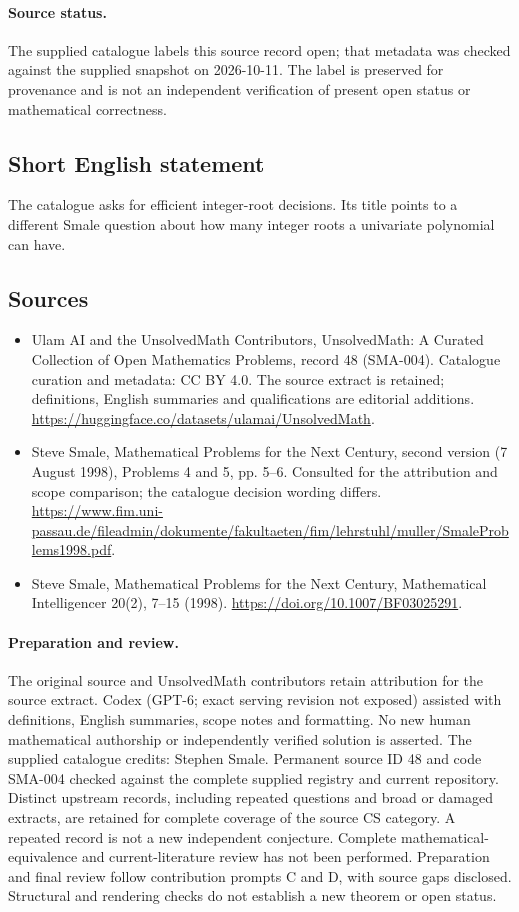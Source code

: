 \documentclass[11pt]{article}
\begin{document}
\paragraph{Source status.}
The supplied catalogue labels this source record open; that metadata was checked against the supplied snapshot on 2026-10-11. The label is preserved for provenance and is not an independent verification of present open status or mathematical correctness.
\subsection{Short English statement}
The catalogue asks for efficient integer-root decisions. Its title points to a different Smale question about how many integer roots a univariate polynomial can have.
\subsection{Sources}
\begin{itemize}
\item[\hypertarget{source:48:1}{S1}] Ulam AI and the UnsolvedMath Contributors, UnsolvedMath: A Curated Collection of Open Mathematics Problems, record 48 (SMA-004). Catalogue curation and metadata: CC BY 4.0. The source extract is retained; definitions, English summaries and qualifications are editorial additions.
\url{https://huggingface.co/datasets/ulamai/UnsolvedMath}.
\item[\hypertarget{source:48:2}{S2}] Steve Smale, Mathematical Problems for the Next Century, second version (7 August 1998), Problems 4 and 5, pp. 5--6. Consulted for the attribution and scope comparison; the catalogue decision wording differs.
\url{https://www.fim.uni-passau.de/fileadmin/dokumente/fakultaeten/fim/lehrstuhl/muller/SmaleProblems1998.pdf}.
\item[\hypertarget{source:48:3}{S3}] Steve Smale, Mathematical Problems for the Next Century, Mathematical Intelligencer 20(2), 7--15 (1998).
\url{https://doi.org/10.1007/BF03025291}.
\end{itemize}
\paragraph{Preparation and review.}
The original source and UnsolvedMath contributors retain attribution for the source extract. Codex (GPT-6; exact serving revision not exposed) assisted with definitions, English summaries, scope notes and formatting. No new human mathematical authorship or independently verified solution is asserted. The supplied catalogue credits: Stephen Smale. Permanent source ID 48 and code SMA-004 checked against the complete supplied registry and current repository. Distinct upstream records, including repeated questions and broad or damaged extracts, are retained for complete coverage of the source CS category. A repeated record is not a new independent conjecture. Complete mathematical-equivalence and current-literature review has not been performed. Preparation and final review follow contribution prompts C and D, with source gaps disclosed. Structural and rendering checks do not establish a new theorem or open status.
\label{end:48}
\end{document}
